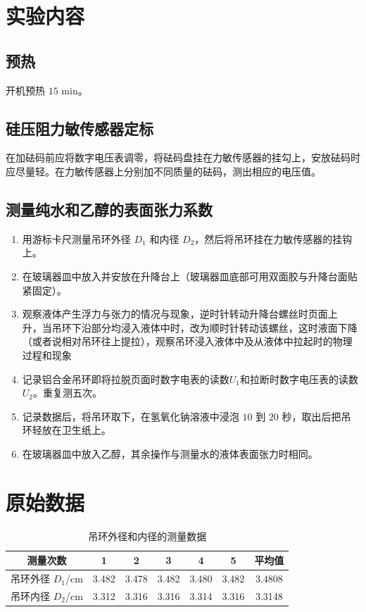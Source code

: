\documentclass[UTF8]{ctexart}
\title{}
\author{}
\date{}
\begin{document}
\section{实验内容}
\subsection{预热} 
开机预热 $15$ min。
\subsection{硅压阻力敏传感器定标} 
在加砝码前应将数字电压表调零，将砝码盘挂在力敏传感器的挂勾上，安放砝码时应尽量轻。在力敏传感器上分别加不同质量的砝码，测出相应的电压值。
\subsection{测量纯水和乙醇的表面张力系数}
\begin{enumerate}
   \item 用游标卡尺测量吊环外径 $D_1$ 和内径 $D_2$，然后将吊环挂在力敏传感器的挂钩上。 
   \item 在玻璃器皿中放入并安放在升降台上（玻璃器皿底部可用双面胶与升降台面贴紧固定）。 
   \item 观察液体产生浮力与张力的情况与现象，逆时针转动升降台螺丝时页面上 升，当吊环下沿部分均浸入液体中时，改为顺时针转动该螺丝，这时液面下降（或者说相对吊环往上提拉），观察吊环浸入液体中及从液体中拉起时的物理过程和现象
   \item 记录铝合金吊环即将拉脱页面时数字电表的读数$U_1$和拉断时数字电压表的读数 $U_2$。重复测五次。 
   \item 记录数据后，将吊环取下，在氢氧化钠溶液中浸泡 $10$ 到 $20$ 秒，取出后把吊环轻放在卫生纸上。
   \item 在玻璃器皿中放入乙醇，其余操作与测量水的液体表面张力时相同。
\end{enumerate}

\section{原始数据}
\begin{table}[H]
\centering
\caption{吊环外径和内径的测量数据}
\begin{tabular}{|c|c|c|c|c|c|c|}
\hline
     测量次数 & 1 & 2 & 3 & 4 & 5 & 平均值 \\
\hline
     吊环外径 $D_1$/cm & 3.482 & 3.478 & 3.482 & 3.480 & 3.482  & 3.4808 \\ 
\hline
     吊环内径 $D_2$/cm & 3.312 & 3.316 & 3.316 & 3.314 & 3.316  & 3.3148 \\ 
\hline
\end{tabular}
\end{table}
\end{document}
